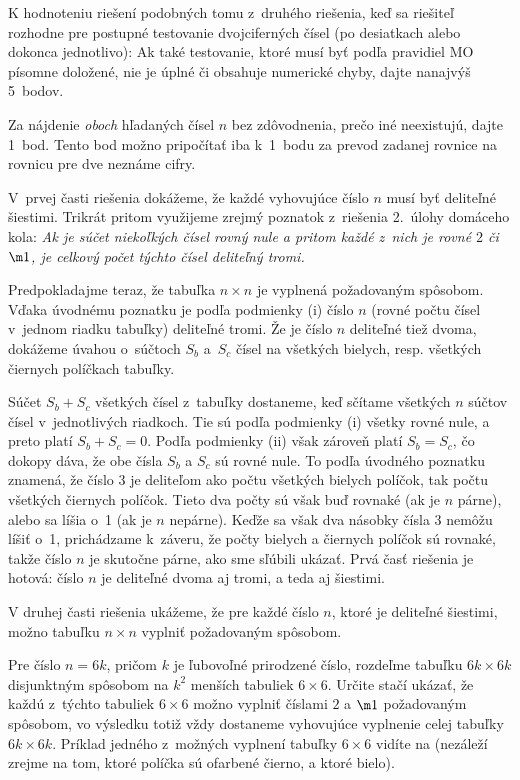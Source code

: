 {K hodnoteniu riešení podobných tomu z~druhého riešenia, keď sa
riešiteľ rozhodne pre postupné testovanie dvojciferných čísel
(po desiatkach alebo dokonca jednotlivo): Ak také testovanie, ktoré
musí byť podľa pravidiel MO písomne doložené, nie je úplné či obsahuje
numerické chyby, dajte nanajvýš 5~bodov.

Za nájdenie {\it oboch\/} hľadaných čísel $n$ bez zdôvodnenia, prečo
iné neexistujú, dajte 1~bod. Tento bod možno pripočítať
iba k~1~bodu za prevod zadanej rovnice na rovnicu pre dve
neznáme cifry.
\endschema
}

{%
V~prvej časti riešenia dokážeme, že každé vyhovujúce číslo $n$ musí
byť deliteľné šiestimi. Trikrát pritom využijeme zrejmý poznatok
z~riešenia 2.~úlohy domáceho kola:
{\sl Ak je súčet niekoľkých čísel rovný nule a pritom každé
z~nich je rovné $2$ či~$\m1$, je celkový počet týchto
čísel deliteľný tromi.}

Predpokladajme teraz, že tabuľka $n\times n$ je vyplnená
požadovaným spôsobom. Vďaka úvodnému poznatku je podľa
podmienky (i) číslo $n$ (rovné počtu čísel v~jednom riadku tabuľky)
deliteľné tromi. Že je číslo $n$ deliteľné tiež dvoma,
dokážeme úvahou o~súčtoch $S_b$ a~$S_c$ čísel na všetkých bielych,
resp. všetkých čiernych políčkach tabuľky.

Súčet $S_b+S_c$ všetkých čísel z~tabuľky dostaneme,
keď sčítame všetkých $n$ súčtov čísel v~jednotlivých riadkoch. Tie sú podľa
podmienky (i) všetky rovné nule, a preto platí $S_b+S_c=0$.
Podľa podmienky (ii) však zároveň platí $S_b=S_c$, čo dokopy
dáva, že obe čísla $S_b$ a $S_c$ sú rovné nule. To podľa
úvodného poznatku znamená, že číslo 3 je deliteľom ako počtu
všetkých bielych políčok, tak počtu všetkých čiernych políčok. Tieto dva počty
sú však buď rovnaké (ak je $n$ párne), alebo sa líšia o~1 (ak je $n$
nepárne). Keďže sa však dva násobky čísla 3 nemôžu líšiť o~1,
prichádzame k~záveru, že počty bielych a čiernych políčok sú rovnaké,
takže číslo $n$ je skutočne párne, ako sme sľúbili ukázať.
Prvá časť riešenia je hotová: číslo $n$ je deliteľné dvoma aj tromi,
a teda aj šiestimi.

V druhej časti riešenia ukážeme, že pre každé číslo $n$, ktoré je
deliteľné šiestimi, možno tabuľku $n\times n$ vyplniť požadovaným spôsobom.

Pre číslo $n=6k$, pričom $k$ je ľubovoľné prirodzené číslo,
rozdeľme tabuľku ${6k\times 6k}$ disjunktným spôsobom na
$k^2$ menších tabuliek $6\times 6$. Určite stačí ukázať, že každú
z~týchto tabuliek $6\times 6$ možno vyplniť číslami $2$ a $\m1$
požadovaným spôsobom, vo výsledku totiž vždy dostaneme
vyhovujúce vyplnenie celej tabuľky $6k\times 6k$.
Príklad jedného z~možných vyplnení tabuľky $6\times 6$
vidíte na \obr{} (nezáleží zrejme na tom,
ktoré políčka sú ofarbené čierno, a ktoré bielo).
%

}
